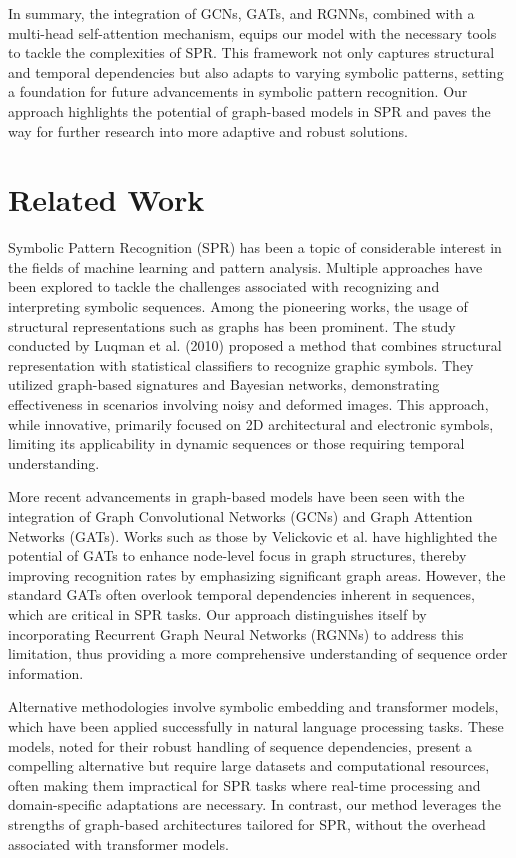 \documentclass{article}
\begin{document}
In summary, the integration of GCNs, GATs, and RGNNs, combined with a multi-head self-attention mechanism, equips our model with the necessary tools to tackle the complexities of SPR. This framework not only captures structural and temporal dependencies but also adapts to varying symbolic patterns, setting a foundation for future advancements in symbolic pattern recognition. Our approach highlights the potential of graph-based models in SPR and paves the way for further research into more adaptive and robust solutions.

\section{Related Work}
Symbolic Pattern Recognition (SPR) has been a topic of considerable interest in the fields of machine learning and pattern analysis. Multiple approaches have been explored to tackle the challenges associated with recognizing and interpreting symbolic sequences. Among the pioneering works, the usage of structural representations such as graphs has been prominent. The study conducted by Luqman et al. (2010) proposed a method that combines structural representation with statistical classifiers to recognize graphic symbols. They utilized graph-based signatures and Bayesian networks, demonstrating effectiveness in scenarios involving noisy and deformed images. This approach, while innovative, primarily focused on 2D architectural and electronic symbols, limiting its applicability in dynamic sequences or those requiring temporal understanding.

More recent advancements in graph-based models have been seen with the integration of Graph Convolutional Networks (GCNs) and Graph Attention Networks (GATs). Works such as those by Velickovic et al. have highlighted the potential of GATs to enhance node-level focus in graph structures, thereby improving recognition rates by emphasizing significant graph areas. However, the standard GATs often overlook temporal dependencies inherent in sequences, which are critical in SPR tasks. Our approach distinguishes itself by incorporating Recurrent Graph Neural Networks (RGNNs) to address this limitation, thus providing a more comprehensive understanding of sequence order information.

Alternative methodologies involve symbolic embedding and transformer models, which have been applied successfully in natural language processing tasks. These models, noted for their robust handling of sequence dependencies, present a compelling alternative but require large datasets and computational resources, often making them impractical for SPR tasks where real-time processing and domain-specific adaptations are necessary. In contrast, our method leverages the strengths of graph-based architectures tailored for SPR, without the overhead associated with transformer models.
\end{document}
